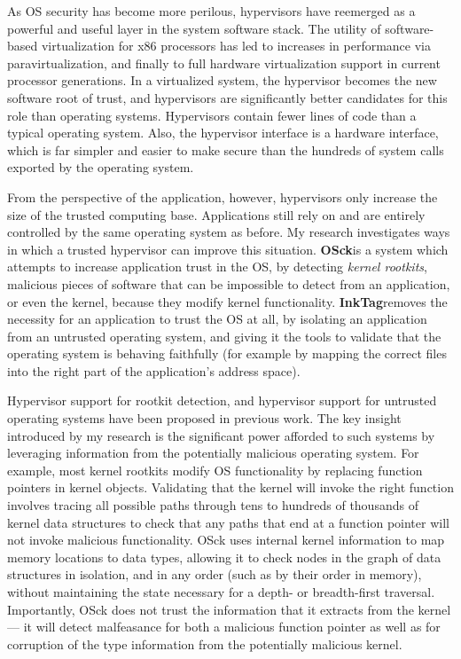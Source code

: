 \documentclass{article}
\newcommand{\osck}{OSck\xspace}
\newcommand{\inktag}{InkTag\xspace}
\begin{document}
As OS security has become more perilous, hypervisors have reemerged as a
powerful and useful layer in the system software stack. The utility of
software-based virtualization for x86 processors has led to increases in
performance via paravirtualization, and finally to full hardware
virtualization support in current processor generations. In a virtualized
system, the hypervisor becomes the new software root of trust, and
hypervisors are significantly better candidates for this role than
operating systems. Hypervisors contain fewer lines of code than a typical
operating system. Also, the hypervisor interface is a hardware interface,
which is far simpler and easier to make secure than the hundreds of system
calls exported by the operating system.


From the perspective of the application, however, hypervisors only increase
the size of the trusted computing base. Applications still rely on and are
entirely controlled by the same operating system as before. My research
investigates ways in which a trusted hypervisor can improve this situation.
\textbf{\osck }is a system which attempts to increase application trust in
the OS, by detecting \emph{kernel rootkits}, malicious pieces of software
that can be impossible to detect from an application, or even the kernel,
because they modify kernel functionality. \textbf{\inktag }removes the
necessity for an application to trust the OS at all, by isolating an
application from an untrusted operating system, and giving it the tools to
validate that the operating system is behaving faithfully (for example by
mapping the correct files into the right part of the application's address
space).

Hypervisor support for rootkit detection, and hypervisor support for
untrusted operating systems have been proposed in previous work.
The key
insight introduced by my research is the significant power afforded to
such systems by leveraging information from the potentially malicious
operating system. For example, most kernel rootkits modify OS functionality
by replacing function pointers in kernel objects. Validating that the
kernel will invoke the right function involves tracing all possible paths
through tens to hundreds of thousands of kernel data structures to check
that any paths that end at a function pointer will not invoke malicious
functionality. \osck uses internal kernel information to map memory
locations to data types, allowing it to check nodes in the graph of data
structures in isolation, and in any order (such as by their order in
memory), without maintaining the state necessary for a depth- or
breadth-first traversal.  Importantly, \osck does not trust the information
that it extracts from the kernel --- it will detect malfeasance for both a
malicious function pointer as well as for corruption of the type
information from the potentially malicious kernel.
\end{document}
